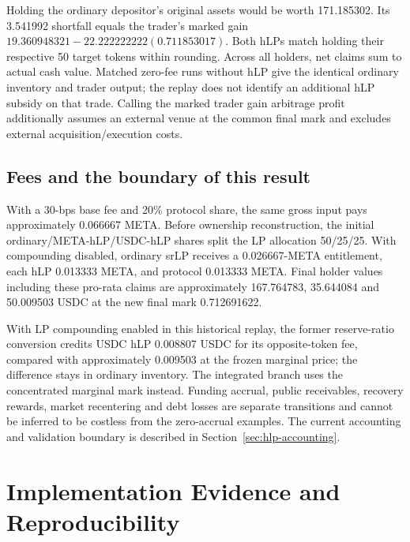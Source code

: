 Holding the ordinary depositor's original assets would be worth 171.185302. Its 3.541992 shortfall equals the trader's marked gain $19.360948321-22.222222222(0.711853017)$. Both hLPs match holding their respective 50 target tokens within rounding. Across all holders, net claims sum to actual cash value. Matched zero-fee runs without hLP give the identical ordinary inventory and trader output; the replay does not identify an additional hLP subsidy on that trade. Calling the marked trader gain arbitrage profit additionally assumes an external venue at the common final mark and excludes external acquisition/execution costs.

\subsection{Fees and the boundary of this result}

With a 30-bps base fee and 20\% protocol share, the same gross input pays approximately 0.066667 META. Before ownership reconstruction, the initial ordinary/META-hLP/USDC-hLP shares split the LP allocation 50/25/25. With compounding disabled, ordinary srLP receives a 0.026667-META entitlement, each hLP 0.013333 META, and protocol 0.013333 META. Final holder values including these pro-rata claims are approximately 167.764783, 35.644084 and 50.009503 USDC at the new final mark 0.712691622.

With LP compounding enabled in this historical replay, the former reserve-ratio conversion credits USDC hLP 0.008807 USDC for its opposite-token fee, compared with approximately 0.009503 at the frozen marginal price; the difference stays in ordinary inventory. The integrated branch uses the concentrated marginal mark instead. Funding accrual, public receivables, recovery rewards, market recentering and debt losses are separate transitions and cannot be inferred to be costless from the zero-accrual examples. The current accounting and validation boundary is described in Section~\ref{sec:hlp-accounting}.

\section{Implementation Evidence and Reproducibility}
\label{app:evidence}

